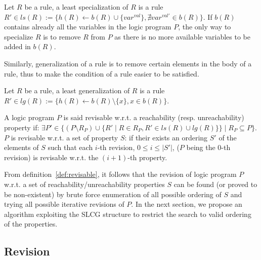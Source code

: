 \begin{definition}
	Let $R$ be a rule, a least specialization of $R$ is a rule $R' \in ls(R) := \{h(R) \leftarrow b(R) \cup \{var^{val}\}, \nexists var^{val'} \in b(R)\}$.
	If $b(R)$ contains already all the variables in the logic program $P$, the only way to specialize $R$ is to remove $R$ from $P$ as there is no more available variables to be added in $b(R)$.
\end{definition}

    Similarly, generalization of a rule is to remove certain elements in the body of a rule, thus to make the condition of a rule easier to be satisfied.

\begin{definition}
	Let $R$ be a rule, a least generalization of $R$ is a rule $R' \in lg(R) := \{h(R) \leftarrow b(R) \setminus \{x\},  x \in b(R)\}$.
\end{definition}

\begin{definition}[Revisable]\label{def:revisable}
	A logic program $P$ is said revisable w.r.t. a reachability (resp. unreachability) property if:
	$\exists P' \in \{(P \setminus R_P) \cup \{R' \mid R \in R_P, R' \in ls(R) \cup lg(R)\} \} \mid R_P \subseteq P\}$.
	$P$ is revisable w.r.t. a set of property $S$:
	if their exists an ordering $S'$ of the elements of $S$ such that each $i$-th revision, $0 \leq i \leq |S'|$, ($P$ being the $0$-th revision) is revisable w.r.t. the $(i+1)$-th property.
\end{definition} 

From definition~\ref{def:revisable}, it follows that the revision of logic program $P$ w.r.t. a set of reachability/unreachability properties $S$ can be found (or proved to be non-existent) by brute force enumeration of all possible ordering of $S$ and trying all possible iterative revisions of $P$.
In the next section, we propose an algorithm exploiting the SLCG structure to restrict the search to valid ordering of the properties.
\subsection{Revision}\label{sec:algorithm}

